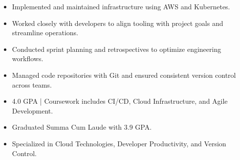 \par\smallskip
\noindent
\begin{minipage}{20cm}
  \begin{minipage}{9.75cm}
    \begin{itemize}
      \item Implemented and maintained infrastructure using AWS and Kubernetes.
      \item Worked closely with developers to align tooling with project goals and streamline operations.
    \end{itemize}
  \end{minipage}
  \hfill
  \begin{minipage}{9.75cm}
    \begin{itemize}
      \item Conducted sprint planning and retrospectives to optimize engineering workflows.
      \item Managed code repositories with Git and ensured consistent version control across teams.
    \end{itemize}
  \end{minipage}
\end{minipage}
\par\smallskip
\divider

\begin{itemize}
  \item 4.0 GPA | Coursework includes CI/CD, Cloud Infrastructure, and Agile Development.
\end{itemize}
\divider

\begin{itemize}
  \item Graduated Summa Cum Laude with 3.9 GPA.
  \item Specialized in Cloud Technologies, Developer Productivity, and Version Control.
\end{itemize}

\noindent
\begin{minipage}{20cm}
\end{minipage}


